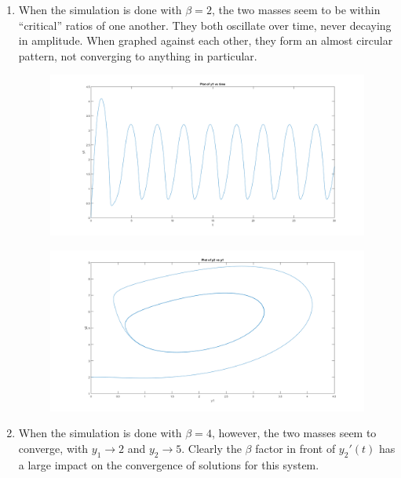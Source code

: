 \documentclass[11pt]{article}
\begin{document}
\begin{enumerate}
	\medskip

	\begin{enumerate}

		\item When the simulation is done with $\beta = 2$, the two masses seem to be within ``critical'' ratios of one another. They both oscillate over time, never decaying in amplitude. When graphed against each other, they form an almost circular pattern, not converging to anything in particular.

		\begin{figure}[H]
		\centering
		\includegraphics[width=\textwidth]{8a1.png}
		\end{figure}

		\medskip

		\begin{figure}[H]
		\centering
		\includegraphics[width=\textwidth]{8a3.png}
		\end{figure}

		\medskip

		\item When the simulation is done with $\beta=4$, however, the two masses seem to converge, with $y_1 \to 2$ and $y_2 \to 5$. Clearly the $\beta$ factor in front of $y_2'(t)$ has a large impact on the convergence of solutions for this system.


\end{enumerate}
\end{enumerate}
\end{document}
